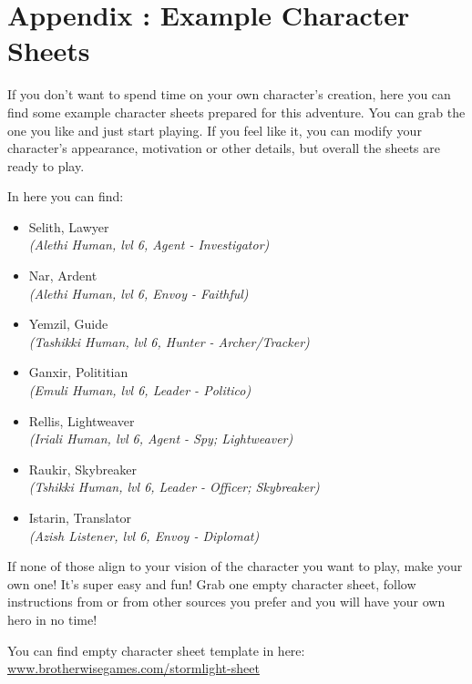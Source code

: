 \chapter{Appendix \thechapter{}: Example Character Sheets}
\label{chap:exampleSheets}

If you don't want to spend time on your own character's creation, here you can find some example character sheets prepared for this adventure. You can grab the one you like and just start playing. If you feel like it, you can modify your character's appearance, motivation or other details, but overall the sheets are ready to play.

In here you can find:
\begin{itemize}
	\item Selith, Lawyer		\\ \textit{(Alethi Human, lvl 6, Agent - Investigator)}
	\item Nar, Ardent 			\\ \textit{(Alethi Human, lvl 6, Envoy - Faithful)}
	\item Yemzil, Guide			\\ \textit{(Tashikki Human, lvl 6, Hunter - Archer/Tracker)}
	\item Ganxir, Polititian	\\ \textit{(Emuli Human, lvl 6, Leader - Politico)}
	\item Rellis, Lightweaver	\\ \textit{(Iriali Human, lvl 6, Agent - Spy; Lightweaver)}
	\item Raukir, Skybreaker	\\ \textit{(Tshikki Human, lvl 6, Leader - Officer; Skybreaker)}
	\item Istarin, Translator	\\ \textit{(Azish Listener, lvl 6, Envoy - Diplomat)}
\end{itemize}
\newpage 

If none of those align to your vision of the character you want to play, make your own one! It's super easy and fun! Grab one empty character sheet, follow instructions from \handbook{} or from other sources you prefer and you will have your own hero in no time!

You can find empty character sheet template in here: \\

\href{https://www.brotherwisegames.com/stormlight-sheet}{www.brotherwisegames.com/stormlight-sheet}
\newpage









